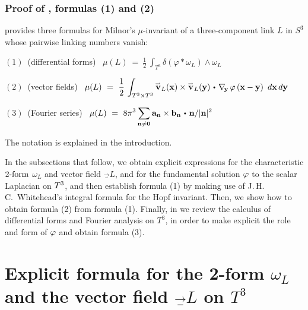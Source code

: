 
\section{Proof of , formulas (1) and (2)}\label{sec:B}

 provides three formulas for Milnor's $\mu$-invariant of a three-component link $L$ in $S^3$ whose pairwise linking numbers vanish:

$(1)$\ (differential forms) \  
$\mu(L) \ = \ \displaystyle{\frac12\, \int_{T^3} \delta(\varphi*\omega_L) \wedge \omega_L}$

$(2)$\ (vector fields) \ 
$\mu(L) \ = \ \displaystyle{\frac12\, \int_{\tor\times\tor} \vec_L(\x) \times \vec_L(\y) \dtw 
\nabla_{\!\y}\,\varphi\left(\x - \y\right)\ d\x\, d\y}$

$(3)$\ (Fourier series) \ 
$\mu(L) \ = \  \displaystyle{8\pi^3 \sum_{\n\ne\zero} \a_\n\times \b_\n\dtw \n/\|\n\|^2}$

\noindent
The notation is explained in the introduction.

In the subsections that follow, we obtain explicit expressions for the characteristic $2\textup{-form}$ $\omega_L$ and vector field $\vec_L$, and for the fundamental solution $\varphi$ to the scalar Laplacian on $T^3$, and then establish formula (1) by making use of J.\,H.\,C.~Whitehead's integral formula for the Hopf invariant. Then, we show how to obtain formula (2) from formula (1). Finally, in 
\secref{B'} we review the calculus of differential forms and Fourier analysis on $T^3$, in order to make explicit the role and form of $\varphi$ and obtain formula (3). 

\part{Explicit formula for the 2-form $\omega_L$ and the vector field $\vec_L$ on $T^3$}

